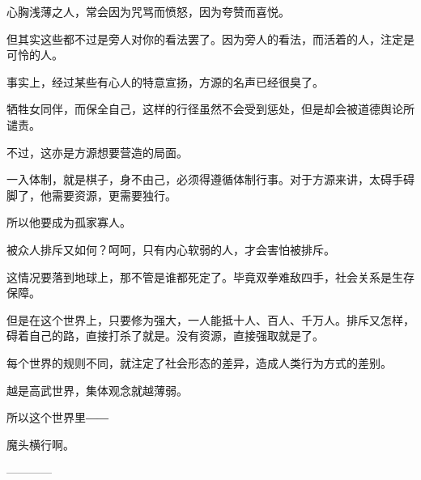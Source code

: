 \begin{this_body}
心胸浅薄之人，常会因为咒骂而愤怒，因为夸赞而喜悦。

但其实这些都不过是旁人对你的看法罢了。因为旁人的看法，而活着的人，注定是可怜的人。

事实上，经过某些有心人的特意宣扬，方源的名声已经很臭了。

牺牲女同伴，而保全自己，这样的行径虽然不会受到惩处，但是却会被道德舆论所谴责。

不过，这亦是方源想要营造的局面。

一入体制，就是棋子，身不由己，必须得遵循体制行事。对于方源来讲，太碍手碍脚了，他需要资源，更需要独行。

所以他要成为孤家寡人。

被众人排斥又如何？呵呵，只有内心软弱的人，才会害怕被排斥。

这情况要落到地球上，那不管是谁都死定了。毕竟双拳难敌四手，社会关系是生存保障。

但是在这个世界上，只要修为强大，一人能抵十人、百人、千万人。排斥又怎样，碍着自己的路，直接打杀了就是。没有资源，直接强取就是了。

每个世界的规则不同，就注定了社会形态的差异，造成人类行为方式的差别。

越是高武世界，集体观念就越薄弱。

所以这个世界里――

魔头横行啊。

------------

\end{this_body}

